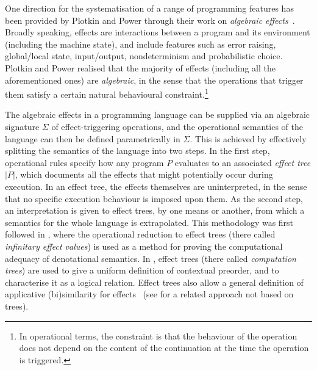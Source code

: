 \documentclass[a4paper,UKenglish]{lipics-v2018}
\theoremstyle{plain}
\begin{document}
One direction for the systematisation of a range of programming features has been provided by Plotkin and Power through their work on
 \emph{algebraic effects}~\cite{plotkin2001adequacy,PlotkinPower2002}. Broadly speaking, effects are interactions between a  program and its environment (including the machine state), and include features such as
 error raising, global/local state, input/output, nondeterminism and probabilistic choice. 
 Plotkin and Power realised that the majority of effects (including all the aforementioned ones) are \emph{algebraic}, in the sense that the operations that trigger them %
 satisfy a certain natural behavioural constraint.\footnote{In operational terms, the constraint  is that the behaviour of the operation does not depend on the content of the continuation at the time the operation is triggered.} 

The algebraic effects  in a programming language can  be supplied via an algebraic signature $\Sigma$ of effect-triggering operations,
and the operational semantics of the language can then be defined parametrically in $\Sigma$. 
This is achieved by effectively splitting the semantics of 
the language into two steps. In the first step, operational rules specify how any program $P$ evaluates 
to an associated \emph{effect tree} $|P|$, 
which documents  all the effects that might potentially occur during execution. %
In an effect tree, the effects themselves are uninterpreted, in the sense that no specific execution behaviour is imposed upon them. 
As the second step, an interpretation is given to effect trees, by one means or another, from which a semantics for the whole language is extrapolated.
This methodology was first followed in \cite{plotkin2001adequacy}, where the operational reduction to effect trees (there called \emph{infinitary effect values}) is used as a method for proving the computational adequacy of denotational semantics. 
In \cite{gom}, effect trees (there called \emph{computation trees}) are used to give a uniform definition of 
contextual preorder, %
and to characterise it as a logical relation.
Effect trees also allow a general definition of applicative (bi)similarity for effects~\cite{SV2018} (see \cite{Ugo2017} for a related approach not based on trees).

\end{document}
